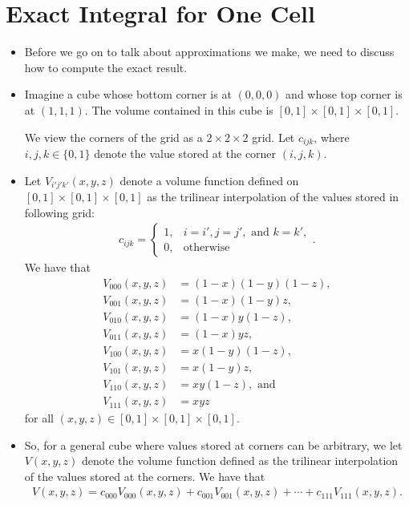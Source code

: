 \documentclass[10pt]{article}
\begin{document}
\section{Exact Integral for One Cell}

\begin{itemize}
    \item Before we go on to talk about approximations we make,
    we need to discuss how to compute the exact result.
    
    \item Imagine a cube whose bottom corner is at $(0,0,0)$
        and whose top corner is at $(1,1,1).$ The volume contained
        in this cube is $[0,1] \times [0,1] \times [0,1].$
        
        We view the corners of the grid as a $2\times 2\times 2$ grid.
        Let $c_{ijk}$, where $i, j, k \in \{0, 1\}$ denote the 
        value stored at the corner $(i,j,k).$
        
    \item Let $V_{i'j'k'}(x,y,z)$ denote a volume function defined
        on $[0,1] \times [0,1] \times [0,1]$ as the trilinear
        interpolation of the values stored in following grid:
        \begin{align*}
            c_{ijk} = \begin{cases}
                1, & i = i', j=j',\mbox{ and } k=k',\\
                0, & \mbox{otherwise}
            \end{cases}.
        \end{align*}
        We have that
        \begin{align*}
            V_{000}(x,y,z) &= (1-x)(1-y)(1-z),\\
            V_{001}(x,y,z) &= (1-x)(1-y)z,\\
            V_{010}(x,y,z) &= (1-x)y(1-z),\\
            V_{011}(x,y,z) &= (1-x)yz,\\
            V_{100}(x,y,z) &= x(1-y)(1-z),\\
            V_{101}(x,y,z) &= x(1-y)z,\\
            V_{110}(x,y,z) &= xy(1-z), \mbox{ and}\\
            V_{111}(x,y,z) &= xyz
        \end{align*}    
        for all $(x,y,z) \in [0,1] \times [0,1] \times [0,1].$
    \item So, for a general cube where values stored at corners
        can be arbitrary, we let $V(x,y,z)$ denote the volume function
        defined as the trilinear interpolation of the values stored
        at the corners. We have that
        \begin{align*}
            V(x,y,z) = c_{000}V_{000}(x,y,z) + c_{001}V_{001}(x,y,z) +
            \dotsb + c_{111}V_{111}(x,y,z).
        \end{align*}
        

\end{itemize}
\end{document}
